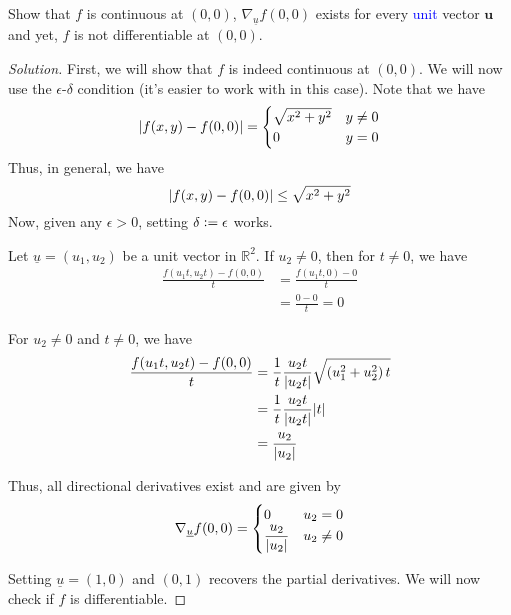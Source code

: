 \documentclass[12pt]{article}
\theoremstyle{definition}
\newenvironment{soln}{\begin{proof}[Solution]}{\end{proof}}
\begin{document}
\begin{enumerate}[leftmargin=*]
    Show that $f$ is continuous at $(0,0)$, $\nabla_{\underline{u}} f(0,0)$ exists for every \textcolor{blue}{unit} vector $\textbf{u}$ and yet, $f$ is not differentiable at $(0,0)$. 
    
    \begin{soln}
        First, we will show that $f$ is indeed continuous at $(0,0)$. We will now use the $\epsilon$-$\delta$ condition (it's easier to work with in this case). Note that we have
        \[
            \abs{f(x,y) - f(0,0)} = \begin{cases}
                \sqrt{x^2+y^2} & y \neq 0 \\
                0 & y = 0
            \end{cases}
        \]
        Thus, in general, we have
        \[
            \abs{f(x,y) - f(0,0)} \leq \sqrt{x^2 + y^2}
        \]
        Now, given any $\epsilon > 0$, setting $\delta \vcentcolon= \epsilon$ works.
        
        \medskip
        
        Let $\underline{u} = (u_1, u_2)$ be a unit vector in $\mathbb{R}^2$. If $u_2 \neq 0$, then for $t\neq 0$, we have
        \begin{align*}
            \frac{f(u_1 t, u_2t) - f(0,0)}{t} &= \frac{f(u_1t, 0) - 0}{t} \\
            &= \frac{0-0}{t} = 0
        \end{align*}
        
        For $u_2 \neq 0$ and $t \neq 0$, we have
        \begin{align*}
            \frac{f(u_1t, u_2t) - f(0,0)}{t} &= \frac{1}{t} \frac{u_2t}{\abs{u_2t}} \sqrt{\left( u_1^2 + u_2^2 \right) t} \\
            &= \frac{1}{t} \frac{u_2t}{\abs{u_2t}} \abs{t} \\
            &= \frac{u_2}{\abs{u_2}}
        \end{align*}
        
        Thus, all directional derivatives exist and are given by
        \[
            \nabla_{\underline{u}} f(0,0) = \begin{cases}
                0 & u_2 = 0 \\
                \dfrac{u_2}{\abs{u_2}} & u_2 \neq 0
            \end{cases}
        \]
        
        Setting $\underline{u} = (1,0)$ and $(0,1)$ recovers the partial derivatives. We will now check if $f$ is differentiable.
        

\end{soln}
\end{enumerate}
\end{document}

